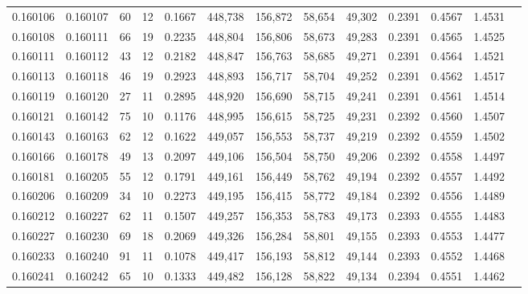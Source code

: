 \begin{tabular}{rrrrrrrrrrrrr}
0.160106 & 0.160107 &    60 &  12 &                                     0.1667 & 448,738 & 156,872 &  58,654 &  49,302 & 0.2391 & 0.4567 & 1.4531 \\
0.160108 & 0.160111 &    66 &  19 &                                     0.2235 & 448,804 & 156,806 &  58,673 &  49,283 & 0.2391 & 0.4565 & 1.4525 \\
0.160111 & 0.160112 &    43 &  12 &                                     0.2182 & 448,847 & 156,763 &  58,685 &  49,271 & 0.2391 & 0.4564 & 1.4521 \\
0.160113 & 0.160118 &    46 &  19 &                                     0.2923 & 448,893 & 156,717 &  58,704 &  49,252 & 0.2391 & 0.4562 & 1.4517 \\
0.160119 & 0.160120 &    27 &  11 &                                     0.2895 & 448,920 & 156,690 &  58,715 &  49,241 & 0.2391 & 0.4561 & 1.4514 \\
0.160121 & 0.160142 &    75 &  10 &                                     0.1176 & 448,995 & 156,615 &  58,725 &  49,231 & 0.2392 & 0.4560 & 1.4507 \\
0.160143 & 0.160163 &    62 &  12 &                                     0.1622 & 449,057 & 156,553 &  58,737 &  49,219 & 0.2392 & 0.4559 & 1.4502 \\
0.160166 & 0.160178 &    49 &  13 &                                     0.2097 & 449,106 & 156,504 &  58,750 &  49,206 & 0.2392 & 0.4558 & 1.4497 \\
0.160181 & 0.160205 &    55 &  12 &                                     0.1791 & 449,161 & 156,449 &  58,762 &  49,194 & 0.2392 & 0.4557 & 1.4492 \\
0.160206 & 0.160209 &    34 &  10 &                                     0.2273 & 449,195 & 156,415 &  58,772 &  49,184 & 0.2392 & 0.4556 & 1.4489 \\
0.160212 & 0.160227 &    62 &  11 &                                     0.1507 & 449,257 & 156,353 &  58,783 &  49,173 & 0.2393 & 0.4555 & 1.4483 \\
0.160227 & 0.160230 &    69 &  18 &                                     0.2069 & 449,326 & 156,284 &  58,801 &  49,155 & 0.2393 & 0.4553 & 1.4477 \\
0.160233 & 0.160240 &    91 &  11 &                                     0.1078 & 449,417 & 156,193 &  58,812 &  49,144 & 0.2393 & 0.4552 & 1.4468 \\
0.160241 & 0.160242 &    65 &  10 &                                     0.1333 & 449,482 & 156,128 &  58,822 &  49,134 & 0.2394 & 0.4551 & 1.4462 \\

\end{tabular}
